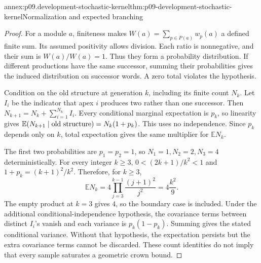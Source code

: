 \begin{annexitem}{annex:p09.development-stochastic-kernel}{thm:p09-development-stochastic-kernel}{Normalization and expected branching}
\begin{proof}
For a module \(a\), finiteness makes \(W(a)=\sum_{p\in P(a)}w_p(a)\)
a defined finite sum. Its assumed positivity allows division.
Each ratio is nonnegative, and their sum is \(W(a)/W(a)=1\).
Thus they form a probability distribution. If different productions
have the same successor, summing their probabilities gives the induced
distribution on successor words. A zero total violates the hypothesis.

Condition on the old structure at generation \(k\), including its finite
count \(N_k\). Let \(I_i\) be the indicator that apex \(i\) produces two
rather than one successor. Then
\(N_{k+1}=N_k+\sum_{i=1}^{N_k}I_i\).
Every conditional marginal expectation is \(p_k\), so linearity gives
\(\mathbb E(N_{k+1}\mid\hbox{old structure})=N_k(1+p_k)\).
This uses no independence. Since \(p_k\) depends only on \(k\), total
expectation gives the same multiplier for \(\mathbb E N_k\).

The first two probabilities are \(p_1=p_2=1\), so
\(N_1=1,N_2=2,N_3=4\) deterministically. For every integer \(k\geq3\),
\(0<(2k+1)/k^2<1\) and \(1+p_k=(k+1)^2/k^2\).
Therefore, for \(k\geq3\),
\[
 \mathbb E N_k
 =4\prod_{j=3}^{k-1}\frac{(j+1)^2}{j^2}
 =4\frac{k^2}{9}.
\]
The empty product at \(k=3\) gives \(4\), so the boundary case is included.
Under the additional conditional-independence hypothesis,
the covariance terms between distinct \(I_i\)'s vanish and each variance
is \(p_k(1-p_k)\). Summing gives the stated conditional variance.
Without that hypothesis, the expectation persists but the extra covariance
terms cannot be discarded. These count identities do not imply that
every sample saturates a geometric crown bound.
\end{proof}
\end{annexitem}
